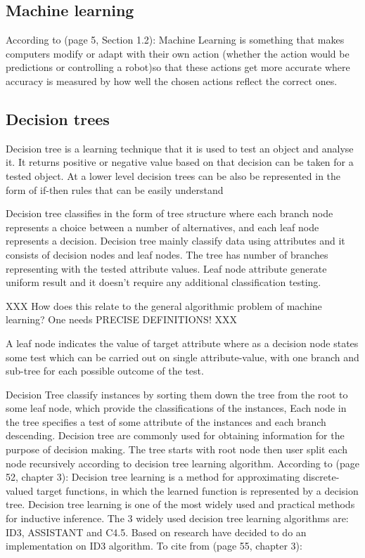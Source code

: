 \documentclass{article}
\begin{document}
\subsection{Machine learning}
\label{sec:machinelearn}

According to \cite{MachineLearning2009AlgorithmicPerspective}(page 5, Section 1.2): Machine Learning is something that makes computers modify or adapt with their own action (whether the action would be predictions or controlling a robot)so that these actions get more accurate where accuracy is measured by how well the chosen actions reflect the correct ones.


\subsection{Decision trees}
\label{sec:dectree}

Decision tree is a learning technique that it is used to test an object and analyse it. It returns positive or negative value based on that decision can be taken for a tested object. At a lower level decision trees can be also be represented in the form of if-then rules that can be easily understand

Decision tree classifies in the form of tree structure where each branch node represents a choice between a number of alternatives, and each leaf node represents a decision. Decision tree mainly classify data using attributes and it consists of decision nodes and leaf nodes. The tree has number of branches representing with the tested attribute values. Leaf node attribute generate uniform result and it doesn't require any additional classification testing.


XXX How does this relate to the general algorithmic problem of machine learning? One needs PRECISE DEFINITIONS! XXX  

A leaf node indicates the value of target attribute where as a decision node states some test which can be carried out on single attribute-value, with one branch and sub-tree for each possible outcome of the test.

Decision Tree classify instances by sorting them down the tree from the root to some leaf node, which provide the classifications of the instances, Each node in the tree specifies a test of some attribute of the instances and each branch descending.
Decision tree are commonly used for obtaining information for the purpose of decision making. The tree starts with root node then user split each node recursively according to decision tree learning algorithm.
According to \cite{Mitchell1997MachineLearning}(page 52, chapter 3): Decision tree learning is a method for approximating discrete-valued target functions, in which the learned function is represented by a decision tree. Decision tree learning is one of the most widely used and practical methods for inductive inference. The 3 widely used decision tree learning algorithms are: ID3, ASSISTANT and C4.5. Based on research have decided to do an implementation on ID3 algorithm. To cite from \cite{Mitchell1997MachineLearning}(page 55, chapter 3):
\end{document}
